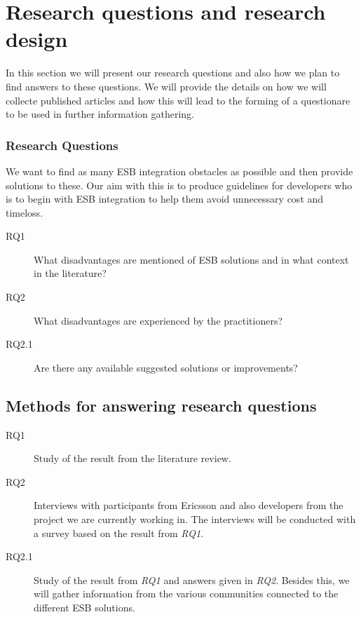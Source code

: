 \documentclass{llncs}
\begin{document}
\section{Research questions and research design}
In this section we will present our research questions and also how we plan to find answers to these questions. We will provide the details on how we will collecte published articles and how this will lead to the forming of a questionare to be used in further information gathering.
\subsubsection{Research Questions}
We want to find as many ESB integration obstacles as possible and then provide solutions to these. Our aim with this is to produce guidelines for developers who is to begin with ESB integration to help them avoid unnecessary cost and timeloss.
\begin{description}
\item[RQ1] What disadvantages are mentioned of ESB solutions and in what context in the literature?
\item[RQ2] What disadvantages are experienced by the practitioners?
\item[RQ2.1] Are there any available suggested solutions or improvements?
\end{description}

\subsection{Methods for answering research questions}

\begin{description}
\item[RQ1] Study of the result from the literature review.
\item[RQ2] Interviews with participants from Ericsson and also developers from the project we are currently working in. The interviews will be conducted with a survey based on the result from \emph{RQ1}.
\item[RQ2.1] Study of the result from \emph{RQ1} and answers given in \emph{RQ2}. Besides this, we will gather information from the various communities connected to the different ESB solutions.
\end{description}
\end{document}
